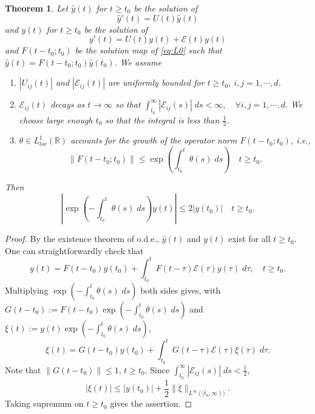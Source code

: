\documentclass[a4paper,11pt]{article}
\newcounter{Theorem}
\newtheorem{theorem}[Theorem]{Theorem}
\theoremstyle{remark}
\begin{document}
\begin{theorem} \label{prop:stab}
Let $\hat{y}(t)$ for $t\ge t_0$ be the solution of
\begin{equation}\label{eq:L0}
  \hat{y}'(t) = U(t)\hat{y}(t)
\end{equation} 
and $y(t)$ for $t\ge t_0$ be the solution of
\begin{equation}\label{eq:L1}
  y'(t) = U(t)y(t) + \mathcal{E}(t)y(t)
\end{equation} 
and $F(t-t_0;t_0)$ be the solution map of \eqref{eq:L0} such that $\hat{y}(t) = F(t-t_0;t_0)\hat{y}(t_0)$. We assume
\begin{enumerate}
   \item $|U_{ij}(t)|$ and $|\mathcal{E}_{ij}(t)|$ are uniformly bounded for $t\ge t_0$, $i,j=1,\cdots,d$.
   \item $\mathcal{E}_{ij}(t)$ decays as $t \rightarrow \infty$ so that %
 $ \int_{t_0}^\infty |\mathcal{E}_{ij}(s)| \; ds < \infty, \quad \forall i,j=1,\cdots,d.$
 We choose large enough $t_0$ so that the integral is less than $\frac{1}{2}$.
   \item $\theta\in L^1_{loc}( \mathbb{R})$ accounts for the growth of the operator norm $F(t-t_0;t_0)$, i.e.,
 $$\big\|F(t-t_0;t_0)\big\| \le \exp\left(\int_{t_0}^t \theta(s)\; ds\right) \quad t\ge t_0.$$  
\end{enumerate}
Then 
$$\left|\exp\left(-\int_{t_0}^t \theta(s)\; ds\right)y(t)\right| \le 2|y(t_0)| \quad t\ge t_0.$$
\end{theorem}
\begin{proof}
By the existence theorem of o.d.e., $\hat{y}(t)$ and $y(t)$ exist for all $t\ge t_0$. One can straightforwardly check that
\begin{equation}\label{eq:integral}
y(t) = F(t-t_0)y(t_0) + \int_{t_0}^t F(t-\tau) \mathcal{E}(\tau)y(\tau) \; d\tau, \quad t\ge t_0.
\end{equation} 
Multiplying $\exp\left(-\int_{t_0}^t \theta(s)\; ds\right)$ both sides gives, with $G(t-t_0):=F(t-t_0)\exp\left(-\int_{t_0}^t \theta(s)\; ds\right)$ and $\xi(t):=y(t)\exp\left(-\int_{t_0}^t \theta(s)\; ds\right)$,
$$ \xi(t) = G(t-t_0)y(t_0) + \int_{t_0}^t G(t-\tau)\mathcal{E}(\tau)\xi(\tau) \; d\tau.$$
Note that $\|G(t-t_0)\|\le 1$, $t\ge t_0$.
Since $\int_{t_0}^\infty |\mathcal{E}_{ij}(s)| \; ds < \frac{1}{2}$, 
$$ |\xi(t)| \le |y(t_0)| + \frac{1}{2}\|\xi\|_{L^\infty([t_0,\infty))}.$$
Taking supremum on $t\ge t_0$ gives the assertion.
\end{proof}
\end{document}
